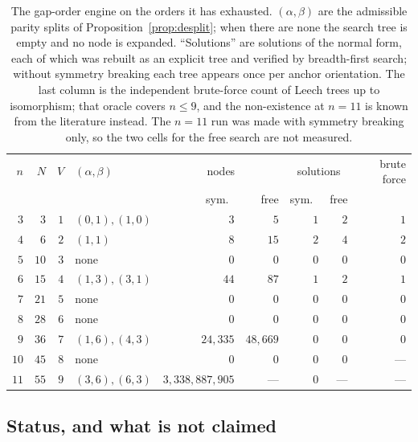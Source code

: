 \begin{table}[ht]
\centering
\caption{The gap-order engine on the orders it has exhausted.  $(\alpha,\beta)$
are the admissible parity splits of Proposition~\ref{prop:desplit}; when there
are none the search tree is empty and no node is expanded.  ``Solutions'' are
solutions of the normal form, each of which was rebuilt as an explicit tree and
verified by breadth-first search; without symmetry breaking each tree appears
once per anchor orientation.  The last column is the independent brute-force
count of Leech trees up to isomorphism; that oracle covers $n\le9$, and the
non-existence at $n=11$ is known from the literature instead.  The $n=11$ run
was made with symmetry breaking only, so the two cells for the free search are
not measured.}
\label{tab:desmall}
\begin{tabular}{@{}rrrlrrrrr@{}}
\toprule
$n$ & $N$ & $V$ & $(\alpha,\beta)$ & \multicolumn{2}{c}{nodes} &
\multicolumn{2}{c}{solutions} & brute force\\
 & & & & sym.\ & free & sym.\ & free & \\
\midrule
$3$ & $3$  & $1$ & $(0,1),(1,0)$ & $3$        & $5$        & $1$ & $2$ & $1$\\
$4$ & $6$  & $2$ & $(1,1)$       & $8$        & $15$       & $2$ & $4$ & $2$\\
$5$ & $10$ & $3$ & none          & $0$        & $0$        & $0$ & $0$ & $0$\\
$6$ & $15$ & $4$ & $(1,3),(3,1)$ & $44$       & $87$       & $1$ & $2$ & $1$\\
$7$ & $21$ & $5$ & none          & $0$        & $0$        & $0$ & $0$ & $0$\\
$8$ & $28$ & $6$ & none          & $0$        & $0$        & $0$ & $0$ & $0$\\
$9$ & $36$ & $7$ & $(1,6),(4,3)$ & $24{,}335$ & $48{,}669$ & $0$ & $0$ & $0$\\
$10$ & $45$ & $8$ & none          & $0$        & $0$        & $0$ & $0$ & ---\\
$11$ & $55$ & $9$ & $(3,6),(6,3)$ & $3{,}338{,}887{,}905$ & --- & $0$ & --- & ---\\
\bottomrule
\end{tabular}
\end{table}

\subsection{Status, and what is not claimed}\label{sec:de:status}

